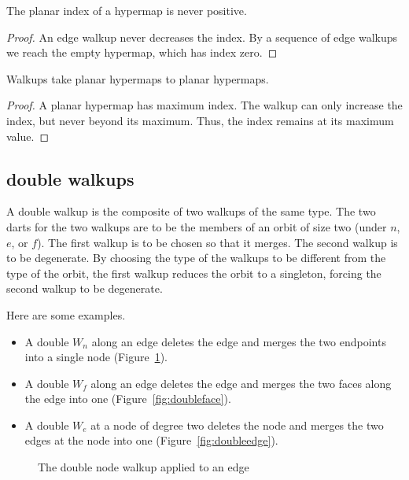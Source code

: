 \begin{lemma}  The planar index
of a hypermap is never positive.
\end{lemma}

\begin{proof}  An edge walkup never decreases the index.  By a sequence
of edge walkups we reach the empty hypermap, which has
index zero.
\end{proof}


\begin{lemma} Walkups take planar hypermaps to planar
hypermaps.
\end{lemma}

\begin{proof}  
A planar hypermap has maximum index.  The walkup
can only increase the index, but never beyond its maximum.  
Thus, the index remains at its maximum value.
\end{proof}


\subsection{double walkups}

A double walkup is the composite of two walkups
of the same type.  The
two darts for the two walkups 
are to be the members of an orbit of size
two (under $n$, $e$, or $f$).  The first walkup is to be
chosen so that it merges.  The second walkup is
to be degenerate.
By choosing the type of the walkups to be different from the type of
the orbit, the first walkup reduces the orbit to a singleton,
forcing the second walkup to be degenerate. 
 
Here are some examples.
\begin{itemize}
    \item A double $W_n$ along an edge deletes the edge and 
   merges the two endpoints into
    a single node (Figure~\ref{fig:doublenode}). 
    \item A double $W_f$ along an edge 
    deletes the edge and merges the two faces along the edge into
    one (Figure~\ref{fig:doubleface}).
    \item A double $W_e$ at a node of degree two
    deletes the node and merges the two edges at the node into
    one (Figure~\ref{fig:doubleedge}).
\end{itemize}


\begin{figure}[htb]
  \centering
  \caption{The double node walkup applied to an edge}
  \label{fig:doublenode}
\end{figure}


